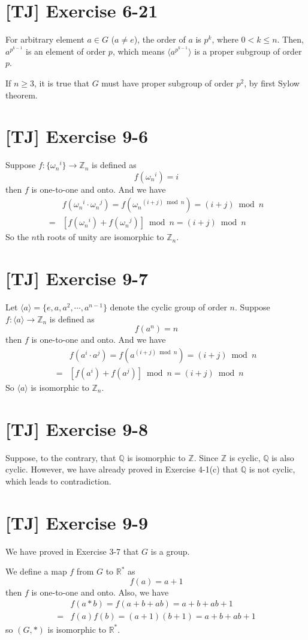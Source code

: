 \documentclass[a4paper,11pt,twocolumn]{article}
\begin{document}
  \section{[TJ] Exercise 6-21}
  For arbitrary element $a \in G$ ($a \neq e$), the order of $a$ is $p^k$, where $0 < k \leq n$. Then, $a^{p^{k-1}}$ is an element of order $p$, which means $\langle a^{p^{k-1}} \rangle$ is a proper subgroup of order $p$. \par
  If $n \geq 3$, it is true that $G$ must have proper subgroup of order $p^2$, by first Sylow theorem.

  \section{[TJ] Exercise 9-6}
  Suppose $f: \{{\omega_n}^i\} \rightarrow \mathbb{Z}_n$ is defined as
   $$ f({\omega_n}^i) = i $$
  then $f$ is one-to-one and onto. And we have
  \begin{align*}
    & f({\omega_n}^i \cdot {\omega_n}^j) = f({\omega_n}^{(i+j) \bmod n}) = (i+j) \bmod n \\
   =& [f({\omega_n}^i) + f({\omega_n}^j)] \bmod n = (i + j) \bmod n
  \end{align*}
  So the $n$th roots of unity are isomorphic to $\mathbb{Z}_n$.

  \section{[TJ] Exercise 9-7}
  Let $\langle a \rangle = \{e, a, a^2, \cdots, a^{n-1}\}$ denote the cyclic group of order $n$. Suppose $f: \langle a \rangle \rightarrow \mathbb{Z}_n$ is defined as
  $$ f(a^n) = n $$
  then $f$ is one-to-one and onto. And we have
  \begin{align*}
    & f(a^i \cdot a^j) = f(a^{(i+j) \bmod n}) = (i+j) \bmod n\\
   =& [f(a^i) + f(a^j)] \bmod n = (i + j) \bmod n
  \end{align*}
  So $\langle a \rangle$ is isomorphic to $\mathbb{Z}_n$.

  \section{[TJ] Exercise 9-8}
  Suppose, to the contrary, that $\mathbb{Q}$ is isomorphic to $\mathbb{Z}$. Since $\mathbb{Z}$ is cyclic, $\mathbb{Q}$ is also cyclic. However, we have already proved in Exercise 4-1(c) that $\mathbb{Q}$ is not cyclic, which leads to contradiction.

  \section{[TJ] Exercise 9-9}
  We have proved in Exercise 3-7 that $G$ is a group. \par
  We define a map $f$ from $G$ to $\mathbb{R}^*$ as
  $$ f(a) = a + 1 $$
  then $f$ is one-to-one and onto. Also, we have
  \begin{align*}
    & f(a * b) = f(a + b + ab) = a+b+ab+1 \\
    =& f(a)f(b) = (a+1)(b+1) = a+b+ab+1
  \end{align*}
  so $(G, *)$ is isomorphic to $\mathbb{R}^*$.
\end{document}
